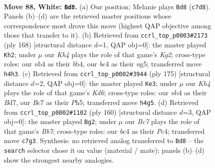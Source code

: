 \documentclass[11pt]{article}
\begin{document}
\clearpage

\begin{figure}[p]\centering
\begin{subfigure}{0.46\textwidth}\centering
\resizebox{\linewidth}{!}{%
\newchessgame
\chessboard[
  setfen={8/2B4k/8/8/1nb4K/8/5P2/8 w - - 21 88},
  showmover=false,
  pgfstyle=straightmove, color=movearrow, markmove={c7-d8}
]}
\caption{}
\end{subfigure}\hfill
\begin{subfigure}{0.46\textwidth}\centering
\resizebox{\linewidth}{!}{%
\newchessgame
\chessboard[
  setfen={4B3/8/8/6n1/1b1k4/1P6/6K1/8 w - - 14 85},
  showmover=false,
  pgfstyle=straightmove, color=movearrow, markmove={g2-h2}
]}
\caption{}
\end{subfigure}
\\[4pt]
\begin{subfigure}{0.46\textwidth}\centering
\resizebox{\linewidth}{!}{%
\newchessgame
\chessboard[
  setfen={8/3b4/8/B6p/5p2/3k4/8/6K1 b - - 23 88},
  showmover=false,
  pgfstyle=straightmove, color=movearrow, markmove={d3-e3}
]}
\caption{}
\end{subfigure}\hfill
\begin{subfigure}{0.46\textwidth}\centering
\resizebox{\linewidth}{!}{%
\newchessgame
\chessboard[
  setfen={8/1B6/5k2/2p5/2P5/6K1/8/3n4 w - - 13 81},
  showmover=false,
  pgfstyle=straightmove, color=movearrow, markmove={b7-g2}
]}
\caption{}
\end{subfigure}
\caption{\textbf{Move 88, White: \texttt{Bd8}.} (a) Our position; Melanie plays \texttt{Bd8} (\texttt{c7d8}). Panels (b)--(d) are the retrieved master positions whose correspondence most drove this move (highest QAP objective among those that transfer to it). (b) Retrieved from \texttt{ccrl\_top\_p0003\#2173} (ply 168) [structural distance $d$=1, QAP obj=0]: the master played \texttt{Kh2}; under $\mu$ our \emph{Kh4} plays the role of that game's \emph{Kg2}; cross-type roles: our \emph{n}b4 as their \emph{b}b4, our \emph{b}c4 as their \emph{n}g5; transferred move \texttt{h4h3}. (c) Retrieved from \texttt{ccrl\_top\_p0002\#3944} (ply 175) [structural distance $d$=2, QAP obj=0]: the master played \texttt{Ke3}; under $\mu$ our \emph{Kh4} plays the role of that game's \emph{Kd6}; cross-type roles: our \emph{n}b4 as their \emph{B}d7, our \emph{B}c7 as their \emph{P}h5; transferred move \texttt{h4g5}. (d) Retrieved from \texttt{ccrl\_top\_p0002\#1102} (ply 160) [structural distance $d$=3, QAP obj=0]: the master played \texttt{Bg2}; under $\mu$ our \emph{Bc7} plays the role of that game's \emph{Bb7}; cross-type roles: our \emph{b}c4 as their \emph{P}c4; transferred move \texttt{c7g3}. Synthesis: no retrieved analog transferred to \texttt{Bd8} -- the \texttt{search} selector chose it on value (material / mate); panels (b)--(d) show the strongest nearby analogies.}
\label{fig:thought-m174}
\end{figure}
\end{document}
